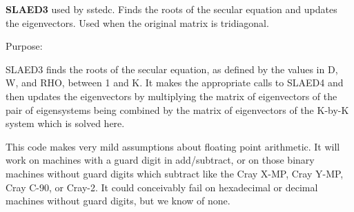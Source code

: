 {\bfseries S\+L\+A\+E\+D3} used by sstedc. Finds the roots of the secular equation and updates the eigenvectors. Used when the original matrix is tridiagonal. 

 \begin{DoxyParagraph}{Purpose\+: }
\begin{DoxyVerb} SLAED3 finds the roots of the secular equation, as defined by the
 values in D, W, and RHO, between 1 and K.  It makes the
 appropriate calls to SLAED4 and then updates the eigenvectors by
 multiplying the matrix of eigenvectors of the pair of eigensystems
 being combined by the matrix of eigenvectors of the K-by-K system
 which is solved here.

 This code makes very mild assumptions about floating point
 arithmetic. It will work on machines with a guard digit in
 add/subtract, or on those binary machines without guard digits
 which subtract like the Cray X-MP, Cray Y-MP, Cray C-90, or Cray-2.
 It could conceivably fail on hexadecimal or decimal machines
 without guard digits, but we know of none.\end{DoxyVerb}
 
\end{DoxyParagraph}

